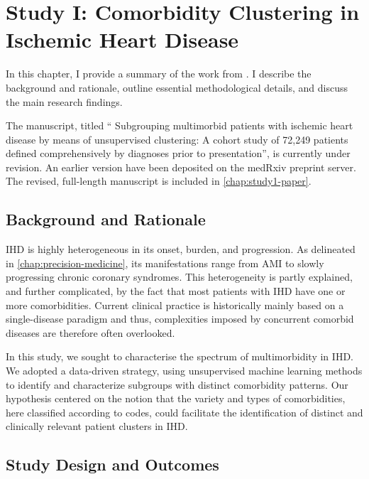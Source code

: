 \chapter{Study I: Comorbidity Clustering in Ischemic Heart Disease}
\label{chap:study1-outline}

In this chapter, I provide a summary of the work from \studyi{}.
I describe the background and rationale,
outline essential methodological details,
and discuss the main research findings.

The manuscript, titled \enquote{%
Subgrouping multimorbid patients with ischemic heart disease by
means of unsupervised clustering: A cohort study of 72,249
patients defined comprehensively by diagnoses prior to
presentation}, is currently under revision.
An earlier version have been deposited on the medRxiv preprint server. 
\autocite{haueSubgrouping2023}
The revised, full-length manuscript is included in 
\cref{chap:study1-paper}.

\section{Background and Rationale}

\Ac{IHD} is highly heterogeneous in its onset, burden, and progression.
As delineated in \cref{chap:precision-medicine}, its manifestations range from 
\ac{AMI} to slowly progressing chronic coronary syndromes.
This heterogeneity is partly explained, and further complicated,
by the fact that most patients with \ac{IHD} have one or more 
comorbidities.
Current clinical practice is historically mainly based on a single-disease paradigm
and thus, complexities imposed by concurrent comorbid diseases are therefore 
often overlooked.
~\autocite{formanMultimorbidity2018}

In this study, we sought to characterise the spectrum of multimorbidity
in \ac{IHD}. 
We adopted a data-driven strategy, using unsupervised machine learning
methods to identify and characterize subgroups 
with distinct comorbidity patterns. 
Our hypothesis centered on the notion that the 
variety and types of comorbidities,
here classified according to  codes, 
could facilitate the identification of distinct and clinically relevant 
patient clusters in \ac{IHD}.

\section{Study Design and Outcomes}

